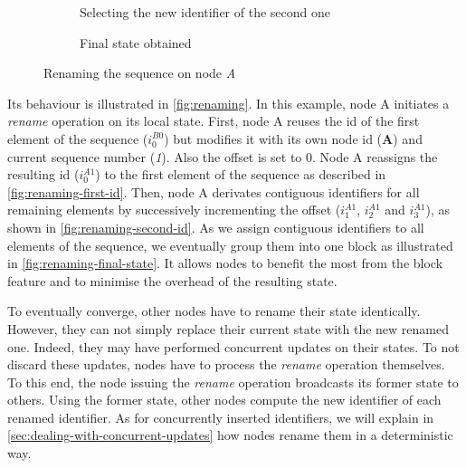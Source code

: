 \documentclass[sigplan,10pt,authorversion]{acmart}
\newcommand{\trm}[1]{\mathit{#1}}
\newcommand{\id}[3]{$\trm{#1}^{\trm{#2}}_{\trm{#3}}$}
\newcommand{\widthletter}{7mm}
\begin{document}
\begin{figure}[ht!]
\begin{subfigure}{\columnwidth}
        \caption{Selecting the new identifier of the second one}
        \label{fig:renaming-second-id}
    \end{subfigure}
    \begin{subfigure}{\columnwidth}
        \caption{Final state obtained}
        \label{fig:renaming-final-state}
    \end{subfigure}
    \caption{Renaming the sequence on node \emph{A}}
    \label{fig:renaming}
\end{figure}

Its behaviour is illustrated in \autoref{fig:renaming}.
In this example, node A initiates a \emph{rename} operation on its local state.
First, node A reuses the id of the first element of the sequence (\id{i}{B0}{0}) but modifies it with its own node id (\textbf{A}) and current sequence number (\emph{1}).
Also the offset is set to 0.
Node A reassigns the resulting id (\id{i}{A1}{0}) to the first element of the sequence as described in \autoref{fig:renaming-first-id}.
Then, node A derivates contiguous identifiers for all remaining elements by successively incrementing the offset (\id{i}{A1}{1}, \id{i}{A1}{2} and \id{i}{A1}{3}), as shown in \autoref{fig:renaming-second-id}.
As we assign contiguous identifiers to all elements of the sequence, we eventually group them into one block as illustrated in \autoref{fig:renaming-final-state}.
It allows nodes to benefit the most from the block feature and to minimise the overhead of the resulting state.

To eventually converge, other nodes have to rename their state identically.
However, they can not simply replace their current state with the new renamed one.
Indeed, they may have performed concurrent updates on their states.
To not discard these updates, nodes have to process the \emph{rename} operation themselves.
To this end, the node issuing the \emph{rename} operation broadcasts its former state to others.
Using the former state, other nodes compute the new identifier of each renamed identifier.
As for concurrently inserted identifiers, we will explain in \autoref{sec:dealing-with-concurrent-updates} how nodes rename them in a deterministic way.
\end{document}
